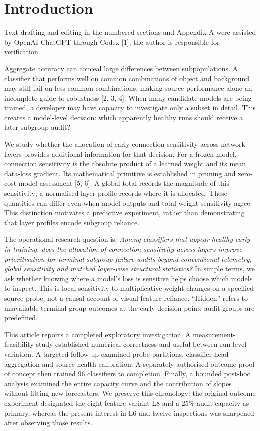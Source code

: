 \section{Introduction}
\noindent Text drafting and editing in the numbered sections and Appendix A were assisted by OpenAI ChatGPT through Codex [1]; the author is responsible for verification.

\label{sec:intro}
Aggregate accuracy can conceal large differences between subpopulations. A classifier that performs well on common combinations of object and background may still fail on less common combinations, making source performance alone an incomplete guide to robustness [2, 3, 4]. When many candidate models are being trained, a developer may have capacity to investigate only a subset in detail. This creates a model-level decision: which apparently healthy runs should receive a later subgroup audit?

We study whether the allocation of early connection sensitivity across network layers provides additional information for that decision. For a frozen model, connection sensitivity is the absolute product of a learned weight and its mean data-loss gradient. Its mathematical primitive is established in pruning and zero-cost model assessment [5, 6]. A global total records the magnitude of this sensitivity; a normalised layer profile records where it is allocated. These quantities can differ even when model outputs and total weight sensitivity agree. This distinction motivates a predictive experiment, rather than demonstrating that layer profiles encode subgroup reliance.

The operational research question is: \emph{Among classifiers that appear healthy early in training, does the allocation of connection sensitivity across layers improve prioritisation for terminal subgroup-failure audits beyond conventional telemetry, global sensitivity and matched layer-wise structural statistics?} In simple terms, we ask whether knowing where a model's loss is sensitive helps choose which models to inspect. This is local sensitivity to multiplicative weight changes on a specified source probe, not a causal account of visual feature reliance. ``Hidden'' refers to unavailable terminal group outcomes at the early decision point; audit groups are predefined.

This article reports a completed exploratory investigation. A measurement-feasibility study established numerical correctness and useful between-run level variation. A targeted follow-up examined probe partitions, classifier-head aggregation and source-health calibration. A separately authorised outcome proof of concept then trained 96 classifiers to completion. Finally, a bounded post-hoc analysis examined the entire capacity curve and the contribution of slopes without fitting new forecasters. We preserve this chronology: the original outcome experiment designated the eight-feature variant L8 and a 25\% audit capacity as primary, whereas the present interest in L6 and twelve inspections was sharpened after observing those results.

